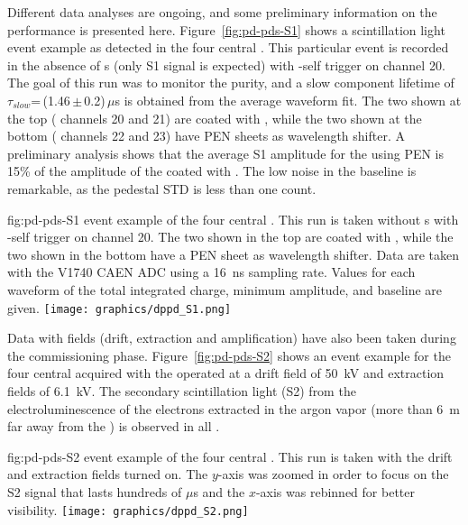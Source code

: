 Different data analyses are ongoing, and some preliminary information on the   performance is presented here. Figure~\ref{fig:pd-pds-S1} shows a scintillation light event example as detected in the four central . This particular event is recorded in the absence of \efield{}s (only S1 signal is expected) with -self trigger on  channel 20. The goal of this run was to monitor the  purity, and a slow component lifetime of $\tau_{slow}$=\,(1.46\,$\pm$\,0.2)\,$\mu$s is obtained from the average waveform fit. The two  shown at the top ( channels 20 and 21) are coated with , while the two shown at the bottom ( channels 22 and 23) have PEN sheets as wavelength shifter. A preliminary analysis shows that the average S1 amplitude for the  using PEN is 15\% of the amplitude of the  coated with . The low noise in the baseline is remarkable, as the pedestal STD is less than one  count. 

\begin{dunefigure}{fig:pd-pds-S1} { event example of the four central . This run is taken without \efield{}s with -self trigger on  channel 20. The two  shown in the top are coated with , while the two shown in the bottom have a PEN sheet as wavelength shifter. Data are taken with the V1740 CAEN ADC using a \SI{16}{ns} sampling rate. Values for each waveform of the total integrated charge, minimum amplitude, and baseline are given.}
\texttt{[image: graphics/dppd\_S1.png]}
\end{dunefigure}

Data with fields (drift, extraction and amplification) have also been taken during the commissioning phase. Figure~\ref{fig:pd-pds-S2} shows an event example for the four central  acquired with the  operated at a drift field of \SI{50}{kV} and extraction fields of \SI{6.1}{kV}. The secondary scintillation light (S2) from the electroluminescence of the electrons extracted in the argon vapor (more than \SI{6}{m} far away from the ) is observed in all .

\begin{dunefigure}{fig:pd-pds-S2} { event example of the four central . %
This run is taken with the drift and extraction fields turned on. %
The $y$-axis was zoomed in order to focus on the S2 signal that lasts hundreds of $\mu$s and the $x$-axis was rebinned for better visibility.}
\texttt{[image: graphics/dppd\_S2.png]}
\end{dunefigure}
